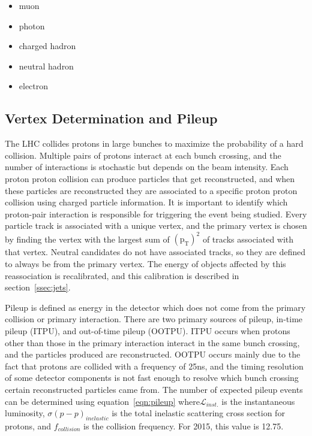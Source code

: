\begin{itemize}
\item muon          
\item photon        
\item charged hadron
\item neutral hadron
\item electron      
\end{itemize}

\subsection{Vertex Determination and Pileup}
\label{ssec:vtxandpileup}
The LHC collides protons in large bunches to maximize the probability of a hard collision.
Multiple pairs of protons interact at each bunch crossing,
and the number of interactions is stochastic but depends on the beam intensity.
Each proton proton collision can produce particles that get reconstructed,
and when these particles are reconstructed they are associated to a specific proton proton collision using charged particle information.
It is important to identify which proton-pair interaction is responsible for triggering the event being studied.
Every particle track is associated with a unique vertex,
and the primary vertex is chosen by finding the vertex with the largest sum of $\mathrm{(p_{T})^{2}}$ of tracks associated with that vertex.
Neutral candidates do not have associated tracks, so they are defined to always be from the primary vertex.
The energy of objects affected by this reassociation is recalibrated, and this calibration is described in section~\ref{ssec:jets}.

Pileup is defined as energy in the detector which does not come from the primary collision or primary interaction.
There are two primary sources of pileup, in-time pileup (ITPU), and out-of-time pileup (OOTPU).
ITPU occurs when protons other than those in the primary interaction interact in the same bunch crossing,
and the particles produced are reconstructed.
OOTPU occurs mainly due to the fact that protons are collided with a frequency of 25ns,
and the timing resolution of some detector components is not fast enough to resolve which bunch crossing certain reconstructed particles came from.
The number of expected pileup events can be determined using equation~\ref{eqn:pileup} where$\mathcal{L}_{inst.}$ is the instantaneous luminosity,
$\sigma(p-p)_{inelastic}$ is the total inelastic scattering cross section for protons,
and $f_{collision}$ is the collision frequency.
For 2015, this value is 12.75.

